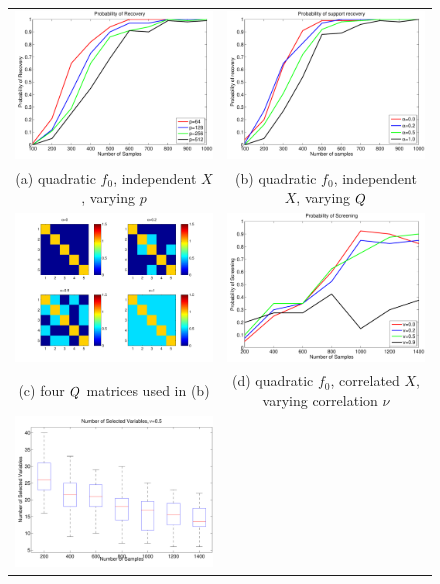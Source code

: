\begin{figure}[!t]
\begin{center}
\begin{tabular}{cc}
\includegraphics[width=.42\textwidth]{figs/CurveT} &
\includegraphics[width=.42\textwidth]{figs/CurveR} \\
(a) quadratic $f_0$, independent $X$, varying $p$  & (b) quadratic $f_0$, independent $X$, varying $Q$ \\
\includegraphics[width=.42\textwidth]{figs/Q} &
\includegraphics[width=.42\textwidth]{figs/CurveC}  \\
(c) four $Q$ matrices used in (b) & (d) quadratic $f_0$, correlated $X$, varying correlation $\nu$ \\
\includegraphics[width=.42\textwidth]{figs/C_support_box} & 

\end{tabular}
\end{center}
\end{figure}
